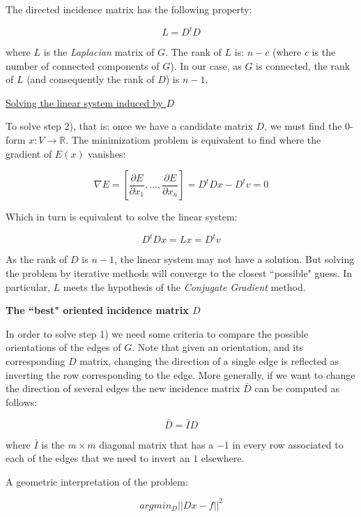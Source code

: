 \documentclass[a4paper,11pt]{article}
\begin{document}
The directed incidence matrix has the following property:

$$L = D^t D$$

where $L$ is the \textit{Laplacian} matrix of $G$. The rank of 
$L$ is: $n-c$ (where $c$ is the number of connected components of $G$). 
In our case, as $G$ is connected, the rank of $L$ (and consequently the 
rank of $D$) is $n-1$.

\bigskip

\underline{Solving the linear system induced by $D$}

\bigskip

To solve step 2), that is: once we have a candidate matrix $D$, we must 
find the 0-form $x: V \rightarrow \mathbb{R}$. The minimizatiom problem 
is equivalent to find where the gradient of $E(x)$ vanishes:
 
$$\nabla E = [\frac{\partial E}{\partial x_1}, \dots, \frac{\partial 
E}{\partial x_n}] = D^tDx-D^tv=0$$

Which in turn is equivalent to solve the linear system:

$$D^tDx = Lx = D^tv$$

As the rank of $D$ is $n-1$, the linear system may not have a solution. 
But solving the problem by iterative methods will converge to the 
closest ``possible" guess. In particular, $L$ meets the hypothesis of 
the \textit{Conjugate Gradient} method.

\bigskip

\textbf{The ``best" oriented incidence matrix $D$}

\bigskip

In order to solve step 1) we need some criteria to compare the possible 
orientations of the edges of $G$. Note that given an orientation, and its 
corresponding $D$ matrix, changing the direction of a single edge is 
reflected as inverting the row corresponding to the edge. More generally, 
if we want to change the direction of several edges the new incidence 
matrix $\bar{D}$ can be computed as follows:

$$\bar{D} = \bar{I} D$$

\bigskip

where $\bar{I}$ is the $m \times m$ diagonal matrix that has a $-1$ in 
every row associated to each of the edges that we need to invert an $1$ 
elsewhere.

\bigskip

A geometric interpretation of the problem: 

$$argmin_D||Dx-f||^2$$
\end{document}
